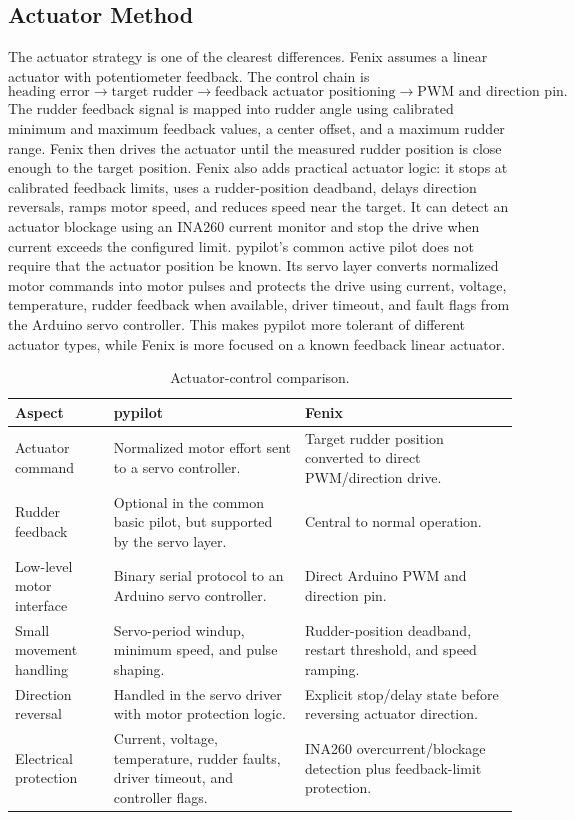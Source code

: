 \documentclass[11pt,twocolumn]{article}
\begin{document}
\subsection{Actuator Method}
The actuator strategy is one of the clearest differences.  Fenix assumes a
linear actuator with potentiometer feedback.  The control chain is
\[
\text{heading error}
\rightarrow
\text{target rudder}
\rightarrow
\text{feedback actuator positioning}
\rightarrow
\text{PWM and direction pin}.
\]
The rudder feedback signal is mapped into rudder angle using calibrated
minimum and maximum feedback values, a center offset, and a maximum rudder
range.  Fenix then drives the actuator until the measured rudder position
is close enough to the target position.
Fenix also adds practical actuator logic: it stops at calibrated feedback
limits, uses a rudder-position deadband, delays direction reversals,
ramps motor speed, and reduces speed near the target.  It can detect an
actuator blockage using an INA260 current monitor and stop the drive when
current exceeds the configured limit.
pypilot's common active pilot does not require that the actuator position
be known.  Its servo layer converts normalized motor commands into motor
pulses and protects the drive using current, voltage, temperature, rudder
feedback when available, driver timeout, and fault flags from the Arduino
servo controller.  This makes pypilot more tolerant of different actuator
types, while Fenix is more focused on a known feedback linear actuator.
\begin{table}[t]
\centering
\caption{Actuator-control comparison.}
\label{tab:pypilot-fenix-actuator}
\begin{tabularx}{\textwidth}{Z{0.18\textwidth}YY}
\toprule
Aspect & pypilot & Fenix \\
\midrule
Actuator command &
Normalized motor effort sent to a servo controller. &
Target rudder position converted to direct PWM/direction drive. \\
Rudder feedback &
Optional in the common basic pilot, but supported by the servo layer. &
Central to normal operation. \\
Low-level motor interface &
Binary serial protocol to an Arduino servo controller. &
Direct Arduino PWM and direction pin. \\
Small movement handling &
Servo-period windup, minimum speed, and pulse shaping. &
Rudder-position deadband, restart threshold, and speed ramping. \\
Direction reversal &
Handled in the servo driver with motor protection logic. &
Explicit stop/delay state before reversing actuator direction. \\
Electrical protection &
Current, voltage, temperature, rudder faults, driver timeout, and
controller flags. &
INA260 overcurrent/blockage detection plus feedback-limit protection. \\
\bottomrule
\end{tabularx}
\end{table}
\end{document}
